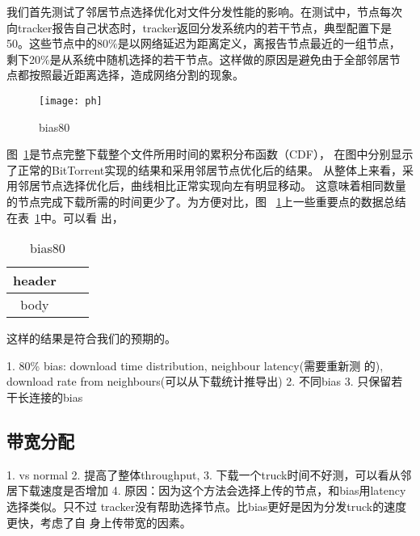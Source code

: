 
我们首先测试了邻居节点选择优化对文件分发性能的影响。在测试中，节点每次
向tracker报告自己状态时，tracker返回分发系统内的若干节点，典型配置下是
50。这些节点中的80\%是以网络延迟为距离定义，离报告节点最近的一组节点，
剩下20\%是从系统中随机选择的若干节点。这样做的原因是避免由于全部邻居节
点都按照最近距离选择，造成网络分割的现象。

\begin{figure}
  \centering
  \begin{minipage}{0.8\linewidth}
    \centering
    \texttt{[image: ph]}
    \caption{bias80}
    \label{fig:bias80}
  \end{minipage}
\end{figure}

图~\ref{fig:bias80}是节点完整下载整个文件所用时间的累积分布函数（CDF），
在图中分别显示了正常的BitTorrent实现的结果和采用邻居节点优化后的结果。
从整体上来看，采用邻居节点选择优化后，曲线相比正常实现向左有明显移动。
这意味着相同数量的节点完成下载所需的时间更少了。为方便对比，图
~\ref{fig:bias80}上一些重要点的数据总结在表~\ref{tbl:bias80}中。可以看
出，

\begin{table}
\centering
\begin{minipage}{0.8\linewidth}
\centering
\caption{bias80}
\label{tbl:bias80}
\begin{tabular}{ccc}

\toprule[1.5pt]
 header \\
\midrule[1pt]
body \\
\bottomrule[1.5pt]
\end{tabular}
\end{minipage}
\end{table}

这样的结果是符合我们的预期的。


1. 80\% bias: download time distribution, neighbour latency(需要重新测
的), download rate from neighbours(可以从下载统计推导出)
2. 不同bias
3. 只保留若干长连接的bias

\subsection{带宽分配}
1. vs normal
2. 提高了整体throughput, 
3. 下载一个truck时间不好测，可以看从邻居下载速度是否增加
4. 原因：因为这个方法会选择上传的节点，和bias用latency选择类似。只不过
tracker没有帮助选择节点。比bias更好是因为分发truck的速度更快，考虑了自
身上传带宽的因素。

